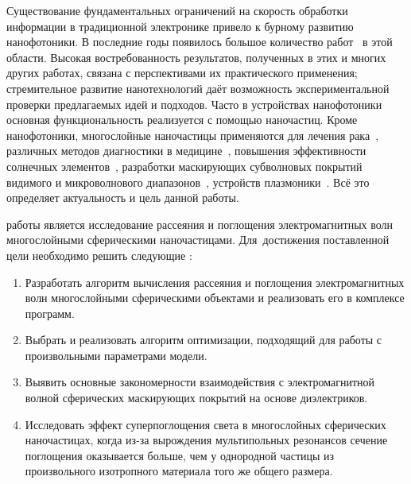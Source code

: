 {\actuality} Существование фундаментальных ограничений на скорость
обработки информации в традиционной электронике привело к бурному
развитию нанофотоники. В последние годы появилось большое количество
работ~\cite{Tame-quantum-plasmonics-2013,
  Javier-graphene-plasmonics-2014, Khurgin-loss-plasmonics-2015,
  He-tunable-terahertz-graphene-metamaterials-2015,
  Segal-meta-nonlinar-PhC-2015,
  Poddubny-hyperbolic-metamaterials-2013, Kildishev-metasurface-2013}
в этой области.  Высокая востребованность результатов, полученных в
этих и многих других работах, связана с перспективами их практического
применения; стремительное развитие нанотехнологий даёт возможность
экспериментальной проверки предлагаемых идей и подходов. Часто в
устройствах нанофотоники основная функциональность реализуется с
помощью наночастиц. Кроме нанофотоники, многослойные наночастицы применяются
для лечения рака~\cite{Zhang-2010, Hirsch-2003}, различных методов
диагностики в медицине~\cite{Allain-2002}, повышения эффективности
солнечных элементов~\cite{Kameya-2011, Mann-2011}, разработки
маскирующих субволновых покрытий видимого и микроволнового
диапазонов~\cite{Qui-2009, Semouchkina-2013}, устройств
плазмоники~\cite{Martin-2013, Alu-2005}.  Всё это определяет
актуальность и цель данной работы.

{\aim} работы является %
исследование рассеяния и поглощения электромагнитных волн многослойными
сферическими наночастицами.
Для~достижения поставленной цели необходимо решить следующие {\tasks}:
\begin{enumerate} %
\item Разработать алгоритм вычисления рассеяния и поглощения
  электромагнитных волн многослойными сферическими объектами и
  реализовать его в комплексе программ.
  \item Выбрать и реализовать алгоритм оптимизации, подходящий для
    работы с произвольными параметрами модели.%
  \item Выявить основные закономерности взаимодействия с
    электромагнитной волной сферических маскирующих покрытий на
    основе диэлектриков.
  \item Исследовать эффект суперпоглощения света в многослойных
    сферических наночастицах, когда из-за вырождения мультипольных
    резонансов сечение поглощения оказывается больше, чем у однородной
    частицы из произвольного изотропного материала того же общего
    размера.
\end{enumerate}

